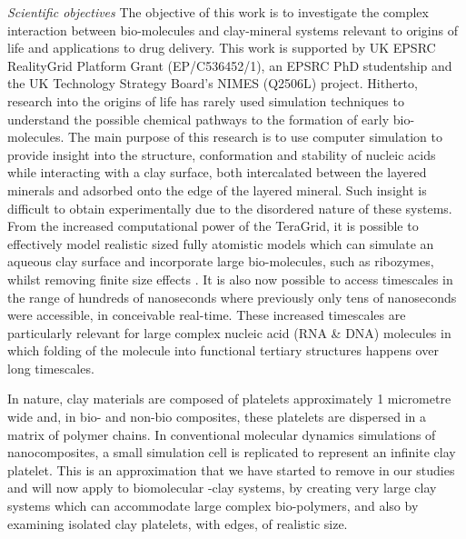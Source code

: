 \begin{compactenum}[a)]
\item \emph{Scientific objectives} 
The objective of this work is to %
investigate the complex interaction between bio-molecules and clay-mineral systems relevant to origins of life and applications to drug delivery. 
This work is supported by UK EPSRC RealityGrid Platform Grant (EP/C536452/1), 
an EPSRC PhD studentship and the UK Technology Strategy Board's NIMES (Q2506L) project.
Hitherto, research into the origins of life has rarely used simulation techniques to understand the possible chemical pathways to the formation of early bio-molecules. The main purpose of this research is to use computer simulation to provide insight into the structure, conformation and stability of nucleic acids while interacting with a clay surface, both intercalated between the layered minerals and adsorbed onto the edge of the layered mineral. Such insight is difficult to obtain experimentally due to the disordered nature of these systems. From the increased computational power of the TeraGrid, it is possible to effectively model realistic sized fully atomistic models which can simulate an aqueous clay surface and incorporate large bio-molecules, such as ribozymes, whilst removing finite size effects \cite{JPCC_2007}. It is also now possible to access timescales in the range of hundreds of nanoseconds where previously only tens of nanoseconds were accessible, in conceivable real-time. These increased timescales are particularly relevant for large complex nucleic acid (RNA \& DNA) molecules in which folding of the molecule into functional tertiary structures happens over long timescales. 

In nature, clay materials are composed of platelets approximately 1
micrometre wide and, in  bio- and non-bio composites, these platelets are dispersed in a matrix of 
polymer chains.  In conventional molecular dynamics simulations of nanocomposites, a small simulation cell is replicated to represent an infinite clay platelet. This is an approximation that we have started to remove in our studies and will now apply to biomolecular -clay systems, by creating very large clay systems which can accommodate large complex bio-polymers, and also by examining isolated clay platelets, with edges, of realistic size. 


\end{compactenum}
